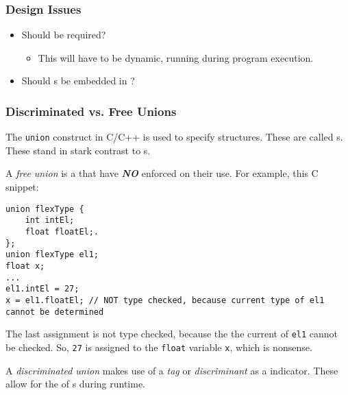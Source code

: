 \subsubsection{Design Issues}\label{subsubsec:Union_Types-Design_Issues}
\begin{itemize}[noitemsep]
\item Should  be required?
  \begin{itemize}[noitemsep]
  \item This  will have to be dynamic, running during program execution.
  \end{itemize}
\item Should s be embedded in ?
\end{itemize}

\subsubsection{Discriminated vs. Free Unions}\label{subsubsec:Union_Types-Discriminated_vs_Free}
The \texttt{union} construct in C/C++ is used to specify  structures.
These are called s.
These stand in stark contrast to s.
\begin{definition}\label{def:Free_Union}
  A \emph{free union} is a  that have \textbf{\textit{NO}}  enforced on their use.
  For example, this C snippet:
\begin{verbatim}
union flexType {
    int intEl;
    float floatEl;.
};
union flexType el1;
float x;
...
el1.intEl = 27;
x = el1.floatEl; // NOT type checked, because current type of el1 cannot be determined
\end{verbatim}
  The last assignment is not type checked, because the the current  of \texttt{el1} cannot be checked.
  So, \texttt{27} is assigned to the \texttt{float} variable \texttt{x}, which is nonsense.
\end{definition}

\begin{definition}\label{def:Discriminated_Union}
  A \emph{discriminated union} makes use of a \emph{tag} or \emph{discriminant} as a  indicator.
  These allow for the  of s during runtime.
\end{definition}

